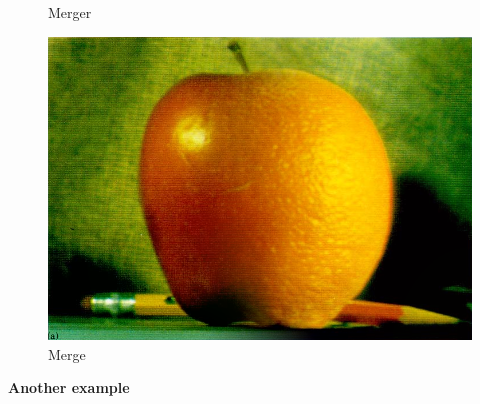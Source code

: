 \documentclass{article}
\begin{document}
    \begin{figure}[!htb]
      \caption{Merger}
    \endminipage \hfill
      \includegraphics[scale=.3]{./blending/ao/final_3.png}
      \caption{Merge}
    \endminipage \hfill
    \end{figure}
    
    \pagebreak
    \textbf{Another example}
    
\end{document}
